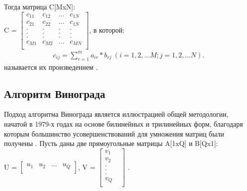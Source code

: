 \documentclass[a4paper,12pt]{report}
\begin{document}
        	\vspace{0.3cm}
        	Тогда матрица C[MxN]:\\
        	C = $\begin{bmatrix}
        		c_{11}& c_{12}& ...& c_{1N}\\
        		c_{21}& c_{22}& ...& c_{1N}\\
        		.& .& .& .\\
        		.& .& .& .\\
        		.& .& .& .\\
        		c_{M1}& c_{M2}& ...& c_{MN}\\
        	\end{bmatrix}$, в которой:\\
        	
        	\vspace{0.3cm}
        	\begin{multline}
        		\label{func:std}
        		c_{ij} = \sum\limits_{r=1}^m a_{ir}*b_{rj} \ (i=1,2,...M; j=1,2,...N).
        	\end{multline} называется их произведением \cite{Beloysov}.\\
        	
        	\vspace{0.6cm}
        	
        	\subsection{Алгоритм Винограда}
        	
        	Подход алгоритма Винограда является иллюстрацией общей методологии, начатой в 1979-х годах на основе билинейных и трилинейных форм, благодаря которым большинство усовершенствований для умножения матриц были получены \cite{Gall2012}.
        	Пусть даны две прямоугольные матрицы A[1xQ] и B[Qx1]:\\
        	U = $\begin{bmatrix}
        		u_{1}& u_{2}& ...& u_{Q}\\
        	\end{bmatrix}$, V = $\begin{bmatrix}
        		v_{1}\\
        		v_{2}\\
        		.&\\
        		.&\\
        		.&\\
        		v_{Q}\\
        	\end{bmatrix}$ .
        	
\end{document}
